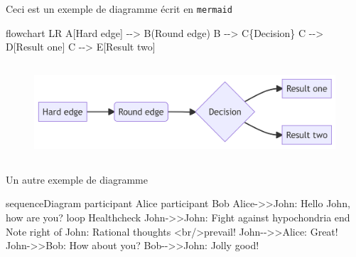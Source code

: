 \documentclass[
  12pt,
  a4paperpaper,
]{book}
\newenvironment{Shaded}{\begin{snugshade}}{\end{snugshade}}
\newcommand{\NormalTok}[1]{\textcolor[rgb]{0.40,0.48,0.51}{#1}}
\begin{document}
Ceci est un exemple de diagramme écrit en \texttt{mermaid}

\begin{Shaded}
\begin{Highlighting}[numbers=left,,]

\NormalTok{flowchart LR}
\NormalTok{  A[Hard edge] {-}{-}\textgreater{} B(Round edge)}
\NormalTok{  B {-}{-}\textgreater{} C\{Decision\}}
\NormalTok{  C {-}{-}\textgreater{} D[Result one]}
\NormalTok{  C {-}{-}\textgreater{} E[Result two]}
\end{Highlighting}
\end{Shaded}

\begin{figure}[H]

{\centering \includegraphics[width=5.74in,height=1.4in]{./03_resultats_files/figure-latex/mermaid-figure-1.png}

}

\end{figure}

Un autre exemple de diagramme

\begin{Shaded}
\begin{Highlighting}[numbers=left,,]

\NormalTok{sequenceDiagram}
\NormalTok{  participant Alice}
\NormalTok{  participant Bob}
\NormalTok{  Alice{-}\textgreater{}\textgreater{}John: Hello John, how are you?}
\NormalTok{  loop Healthcheck}
\NormalTok{    John{-}\textgreater{}\textgreater{}John: Fight against hypochondria}
\NormalTok{  end}
\NormalTok{  Note right of John: Rational thoughts \textless{}br/\textgreater{}prevail!}
\NormalTok{  John{-}{-}\textgreater{}\textgreater{}Alice: Great!}
\NormalTok{  John{-}\textgreater{}\textgreater{}Bob: How about you?}
\NormalTok{  Bob{-}{-}\textgreater{}\textgreater{}John: Jolly good!}
\end{Highlighting}
\end{Shaded}
\end{document}
